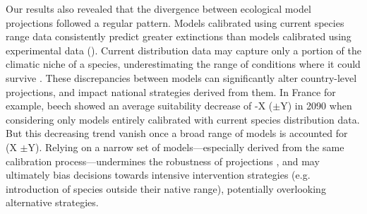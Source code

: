 \documentclass[11pt,letter]{article}
\begin{document}
Our results also revealed that the divergence between ecological model projections followed a regular pattern. Models calibrated using current species range data consistently predict greater extinctions than models calibrated using experimental data (). 
Current distribution data may capture only a portion of the climatic niche of a species, underestimating the range of conditions where it could survive \citep{Chevalier2024, NoguesBravo2016}.
These discrepancies between models can significantly alter country-level projections, and impact national strategies derived from them. 
In France for example, beech showed an average suitability decrease of -X ($\pm$Y) in 2090 when considering only models entirely calibrated with current species distribution data. But this decreasing trend vanish once a broad range of models is accounted for (X $\pm$Y).
Relying on a narrow set of models---especially derived from the same calibration process---undermines the robustness of projections \citep{Dawson2011}, and may ultimately bias decisions towards intensive intervention strategies (e.g. introduction of species outside their native range), potentially overlooking alternative strategies.


\end{document}

